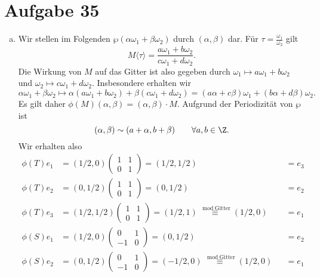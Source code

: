 \documentclass{article}
\begin{document}
  \section*{Aufgabe 35}
  \begin{enumerate}[(a)]
    \item Wir stellen im Folgenden $\wp(\alpha \omega_1 + \beta\omega_2)$ durch $(\alpha, \beta)$ dar.
    Für $\tau = \frac{\omega_1}{\omega_2}$ gilt 
    \[ 
      M\langle\tau\rangle = \frac{a\omega_1 + b\omega_2}{c\omega_1 + d\omega_2}.
    \]
    Die Wirkung von $M$ auf das Gitter ist also gegeben durch $\omega_1 \mapsto a\omega_1 + b\omega_2$ und $\omega_2 \mapsto c\omega_1 + d\omega_2$. Insbesondere erhalten wir
    \[ 
    \alpha \omega_1 + \beta \omega_2 \mapsto \alpha(a \omega_1 + b\omega_2) + \beta(c \omega_1 + d\omega_2) = (a\alpha + c\beta) \omega_1 + (b\alpha + d\beta) \omega_2.
    \]
    Es gilt daher $\phi(M) (\alpha, \beta) = (\alpha, \beta) \cdot M$.
    Aufgrund der Periodizität von $\wp$ ist 
    \[ 
    (\alpha, \beta) \sim (a + \alpha, b + \beta)\qquad  \forall a,b \in \Z.
    \]
    Wir erhalten also
    \begin{align*}
      \phi(T)e_1 &= (1/2, 0)\begin{pmatrix}
        1 & 1\\ 0&1
      \end{pmatrix}  = (1/2, 1/2) &&= e_3\\
      \phi(T)e_2 &= (0,1/2)\begin{pmatrix}
        1 & 1\\ 0&1
      \end{pmatrix} = (0,1/2) &&= e_2\\
      \phi(T)e_3 &= (1/2, 1/2)\begin{pmatrix}
        1 & 1\\ 0&1
      \end{pmatrix} = (1/2, 1) \overset{\mod \text{Gitter}}{\equiv} (1/2,0) &&= e_1\\
      \phi(S)e_1 &= (1/2,0)\begin{pmatrix}
        0 & 1\\
        -1 & 0
      \end{pmatrix} = (0,1/2) &&= e_2\\
      \phi(S)e_2 &= (0,1/2)\begin{pmatrix}
        0 & 1\\
        -1 & 0
      \end{pmatrix} = (-1/2, 0) \overset{\mod \text{Gitter}}{\equiv}  (1/2, 0) &&= e_1\\

\end{align*}
\end{enumerate}
\end{document}
